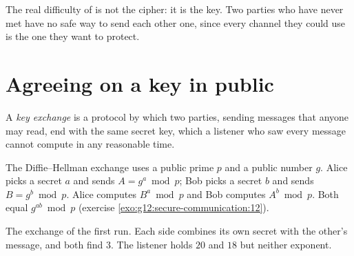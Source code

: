 The real difficulty of  is not the cipher: it is the key. Two parties who have never met have no
safe way to send each other one, since every channel they could use is the one they want to protect.

\section{Agreeing on a key in public}\label{sec:g12:secure-communication:dh}

\begin{definition}\label{def:g12:secure-communication:key-exchange}
A \emph{key exchange} is a protocol by which two parties, sending messages that anyone may read,
end with the same secret key, which a listener who saw every message cannot compute in any reasonable time.
\end{definition}

The Diffie--Hellman exchange uses a public prime $p$ and a public number $g$. Alice picks a secret $a$ and sends
$A = g^a \bmod p$; Bob picks a secret $b$ and sends $B = g^b \bmod p$. Alice computes $B^a \bmod p$ and Bob computes
$A^b \bmod p$. Both equal $g^{ab} \bmod p$ (exercise \ref{exo:g12:secure-communication:12}).

\label{lst:g12:secure-communication:dh}

\label{out:g12:secure-communication:dh}

\begin{omfigure}

{\small The exchange of the first run. Each side combines its own secret with the other's message, and both find
$3$. The listener holds $20$ and $18$ but neither exponent.}
\end{omfigure}

